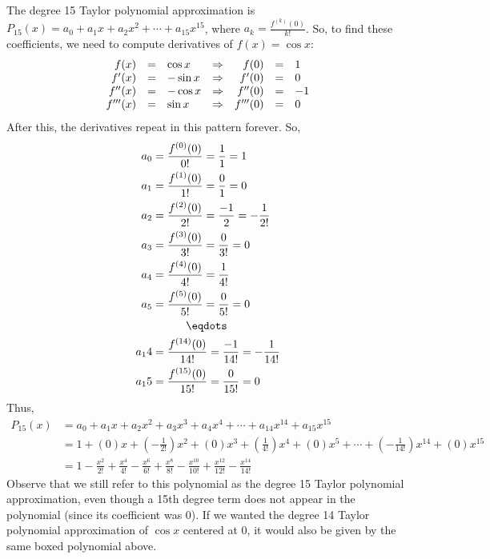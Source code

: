 \documentclass[main]{subfiles}
\begin{document}
\begin{enumerate}
  \begin{solution}
  The degree 15 Taylor polynomial approximation is $P_{15}(x) = a_0 +
  a_1 x + a_2 x^2 + \cdots + a_{15} x^{15}$, where $a_k =
  \frac{f^{(k)}(0)}{k!}$.  So, to find these coefficients, we need to
  compute derivatives of $f(x) = \cos x$:
  \[ \begin{array}{rcl c rcl}
  f(x) & = & \cos x & \Rightarrow & f(0) & = & 1 \\
  f'(x) & = & -\sin x & \Rightarrow & f'(0) & = & 0 \\
  f''(x) & = & -\cos x & \Rightarrow & f''(0) & = & -1 \\
  f'''(x) & = & \sin x & \Rightarrow & f'''(0) & = & 0
  \end{array}\]
  After this, the derivatives repeat in this pattern forever.  So,
  \begin{align*}
  a_0 &=\frac{f^{(0)}(0)}{0!}=\frac{1}{1}=1 \\
  a_1 &=\frac{f^{(1)}(0)}{1!}=\frac{0}{1}=0 \\
  a_2 &=\frac{f^{(2)}(0)}{2!}=\frac{-1}{2}= -\frac{1}{2!} \\
  a_3 &= \frac{f^{(3)}(0)}{3!}=\frac{0}{3!}=0 \\
  a_4 &= \frac{f^{(4)}(0)}{4!}=\frac{1}{4!} \\
  a_5 &= \frac{f^{(5)}(0)}{5!}=\frac{0}{5!}=0 \\
  &~~~~~~~~~\eqdots\\
   a_14 &= \frac{f^{(14)}(0)}{14!}=\frac{-1}{14!}=-\frac{1}{14!}\\
   a_15 &= \frac{f^{(15)}(0)}{15!}=\frac{0}{15!}=0\\
  \end{align*}
  Thus, 
  \begin{align*}
  P_{15}(x) &=a_0+a_1x+a_2x^2+a_3x^3+a_4x^4+\cdots + a_{14}x^{14} + a_{15}x^{15}\\
  &=1+(0)x+\left(-\frac{1}{2!}\right)x^2+(0)x^3+\left(\frac{1}{4!}\right)x^4+(0)x^5+\cdots + \left(-\frac{1}{14!}\right)x^{14}+(0)x^{15}\\
  &= \boxed{1 - \frac{x^2}{2!} + \frac{x^4}{4!} - \frac{x^6}{6!} + \frac{x^8}{8!} - \frac{x^{10}}{10!} +\frac{x^{12}}{12!} -\frac{x^{14}}{14!}}
  \end{align*}  
  Observe that we still refer to this polynomial as the degree 15 Taylor polynomial approximation, even though a 15th degree term does not appear in the polynomial (since its coefficient was 0). If we wanted the degree 14 Taylor polynomial approximation of $\cos x$ centered at 0, it would also be given by the same boxed polynomial above.
  

\end{solution}
\end{enumerate}
\end{document}
